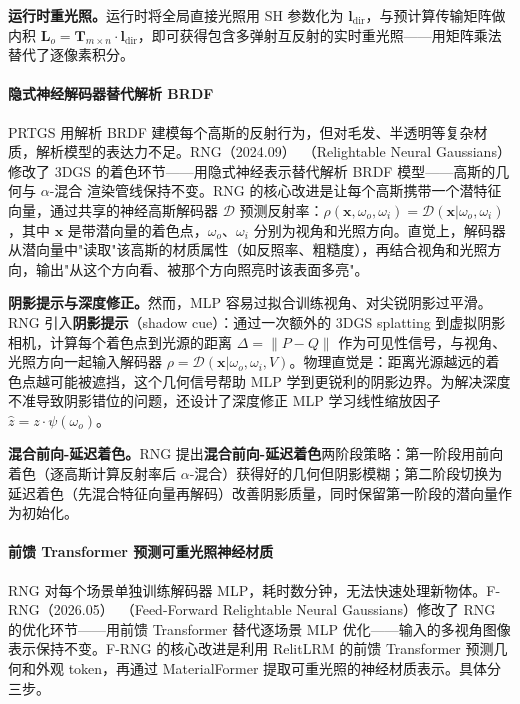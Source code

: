 \textbf{运行时重光照。}运行时将全局直接光照用 SH 参数化为 $\mathbf{l}_{\text{dir}}$，与预计算传输矩阵做内积 $\mathbf{L}_o = \mathbf{T}_{m \times n} \cdot \mathbf{l}_{\text{dir}}$，即可获得包含多弹射互反射的实时重光照——用矩阵乘法替代了逐像素积分。

\paragraph{隐式神经解码器替代解析 BRDF}

PRTGS 用解析 BRDF 建模每个高斯的反射行为，但对毛发、半透明等复杂材质，解析模型的表达力不足。RNG（2024.09）~\cite{2409_19702}（Relightable Neural Gaussians）修改了 3DGS 的着色环节——用隐式神经表示替代解析 BRDF 模型——高斯的几何与 $\alpha$-混合 渲染管线保持不变。RNG 的核心改进是让每个高斯携带一个潜特征向量，通过共享的神经高斯解码器 $\mathcal{D}$ 预测反射率：$\rho(\mathbf{x}, \omega_o, \omega_i) = \mathcal{D}(\mathbf{x} | \omega_o, \omega_i)$，其中 $\mathbf{x}$ 是带潜向量的着色点，$\omega_o$、$\omega_i$ 分别为视角和光照方向。直觉上，解码器从潜向量中"读取"该高斯的材质属性（如反照率、粗糙度），再结合视角和光照方向，输出"从这个方向看、被那个方向照亮时该表面多亮"。

\textbf{阴影提示与深度修正。}然而，MLP 容易过拟合训练视角、对尖锐阴影过平滑。RNG 引入\textbf{阴影提示}（shadow cue）：通过一次额外的 3DGS splatting 到虚拟阴影相机，计算每个着色点到光源的距离 $\Delta = \|P - Q\|$ 作为可见性信号，与视角、光照方向一起输入解码器 $\rho = \mathcal{D}(\mathbf{x} | \omega_o, \omega_i, V)$。物理直觉是：距离光源越远的着色点越可能被遮挡，这个几何信号帮助 MLP 学到更锐利的阴影边界。为解决深度不准导致阴影错位的问题，还设计了深度修正 MLP 学习线性缩放因子 $\hat{z} = z \cdot \psi(\omega_o)$。

\textbf{混合前向-延迟着色。}RNG 提出\textbf{混合前向-延迟着色}两阶段策略：第一阶段用前向着色（逐高斯计算反射率后 $\alpha$-混合）获得好的几何但阴影模糊；第二阶段切换为延迟着色（先混合特征向量再解码）改善阴影质量，同时保留第一阶段的潜向量作为初始化。

\paragraph{前馈 Transformer 预测可重光照神经材质}

RNG 对每个场景单独训练解码器 MLP，耗时数分钟，无法快速处理新物体。F-RNG（2026.05）~\cite{2605_25975}（Feed-Forward Relightable Neural Gaussians）修改了 RNG 的优化环节——用前馈 Transformer 替代逐场景 MLP 优化——输入的多视角图像表示保持不变。F-RNG 的核心改进是利用 RelitLRM 的前馈 Transformer 预测几何和外观 token，再通过 MaterialFormer 提取可重光照的神经材质表示。具体分三步。


